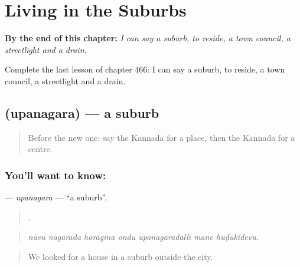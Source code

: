 
\chapter{Living in the Suburbs}
\label{ch:ka-living-in-the-suburbs}

\begin{chapteropening}
\textbf{By the end of this chapter:} \emph{I can say a suburb, to reside, a town council, a streetlight and a drain.}

Complete the last lesson of chapter 466: I can say a suburb, to reside, a town council, a streetlight and a drain.
\end{chapteropening}

\section[\texorpdfstring{\kn{ಉಪನಗರ} (upanagara)}{ಉಪನಗರ (upanagara)}]{ (upanagara) — a suburb}

\label{lesson:KA-C466-upanagara}



\begin{quote}
Before the new one: say the Kannada for a place, then the Kannada for a centre.
\end{quote}

\subsection*{You'll want to know: }
\textbf{} — \emph{upanagara} — \textquotedblleft{}a suburb\textquotedblright{}.

\begin{quote}
      .
\end{quote}

\begin{quote}
\emph{nāvu nagarada horagina ondu upanagaradalli mane huḍukidevu.}
\end{quote}

\begin{quote}
We looked for a house in a suburb outside the city.
\end{quote}

